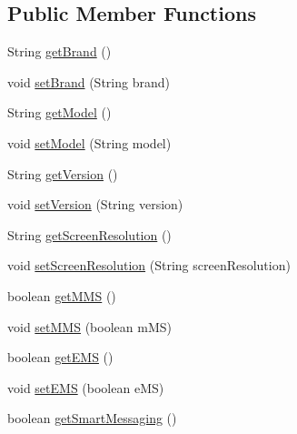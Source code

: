 \subsection*{Public Member Functions}
\begin{DoxyCompactItemize}
\item 
String \hyperlink{classcom_1_1bluevia_1_1directory_1_1data_1_1TerminalInfo_a298106344cee848f396e96ef871c1bd7}{getBrand} ()
\item 
void \hyperlink{classcom_1_1bluevia_1_1directory_1_1data_1_1TerminalInfo_ac4370987e6eacfadd7064ca5628696c5}{setBrand} (String brand)
\item 
String \hyperlink{classcom_1_1bluevia_1_1directory_1_1data_1_1TerminalInfo_a2bf50c35394e1411ed77d7bdaf6d8e78}{getModel} ()
\item 
void \hyperlink{classcom_1_1bluevia_1_1directory_1_1data_1_1TerminalInfo_a8ba70c6ab65cd42e3ac919fc3ba6deaf}{setModel} (String model)
\item 
String \hyperlink{classcom_1_1bluevia_1_1directory_1_1data_1_1TerminalInfo_af53d2b9fee005d70e8d9148d9b32a559}{getVersion} ()
\item 
void \hyperlink{classcom_1_1bluevia_1_1directory_1_1data_1_1TerminalInfo_ad66b8ccfe89d301f5d44918bd78631ff}{setVersion} (String version)
\item 
String \hyperlink{classcom_1_1bluevia_1_1directory_1_1data_1_1TerminalInfo_a454db14314f6f39ec1416305972eede5}{getScreenResolution} ()
\item 
void \hyperlink{classcom_1_1bluevia_1_1directory_1_1data_1_1TerminalInfo_afb89e04d151799ba8424d5ffd3587a94}{setScreenResolution} (String screenResolution)
\item 
boolean \hyperlink{classcom_1_1bluevia_1_1directory_1_1data_1_1TerminalInfo_a809ce7aa1777871b6194a865b3f5cee9}{getMMS} ()
\item 
void \hyperlink{classcom_1_1bluevia_1_1directory_1_1data_1_1TerminalInfo_a2cb052d72ed6ba8bc5d4b256fa7449f7}{setMMS} (boolean mMS)
\item 
boolean \hyperlink{classcom_1_1bluevia_1_1directory_1_1data_1_1TerminalInfo_a597d7ace0c7dab879413e55351d734fa}{getEMS} ()
\item 
void \hyperlink{classcom_1_1bluevia_1_1directory_1_1data_1_1TerminalInfo_ab05fe58ecaf4f2d39843a07804fdfde6}{setEMS} (boolean eMS)
\item 
boolean \hyperlink{classcom_1_1bluevia_1_1directory_1_1data_1_1TerminalInfo_ad46ac26014ebd3492b0d1cef8da9805d}{getSmartMessaging} ()
\item 

\end{DoxyCompactItemize}
